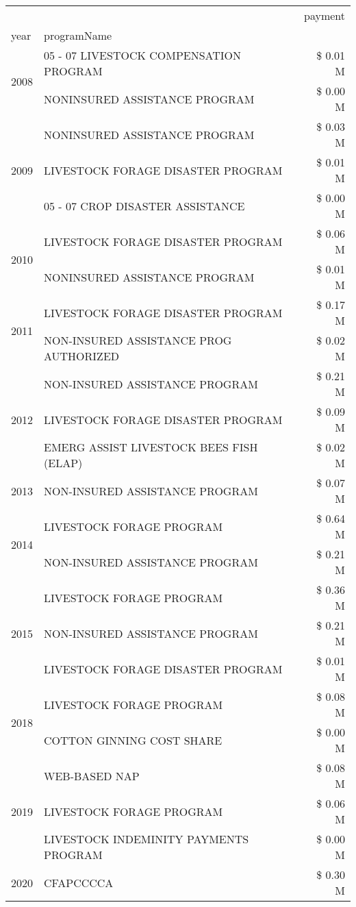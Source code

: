 \begin{tabular}{llr}
\toprule
 &  & payment \\
year & programName &  \\
\midrule
\multirow[t]{2}{*}{2008} & 05 - 07 LIVESTOCK COMPENSATION PROGRAM & \$ 0.01 M \\
 & NONINSURED ASSISTANCE PROGRAM & \$ 0.00 M \\
\cline{1-3}
\multirow[t]{3}{*}{2009} & NONINSURED ASSISTANCE PROGRAM & \$ 0.03 M \\
 & LIVESTOCK FORAGE DISASTER  PROGRAM & \$ 0.01 M \\
 & 05 - 07 CROP DISASTER ASSISTANCE & \$ 0.00 M \\
\cline{1-3}
\multirow[t]{2}{*}{2010} & LIVESTOCK FORAGE DISASTER PROGRAM & \$ 0.06 M \\
 & NONINSURED ASSISTANCE PROGRAM & \$ 0.01 M \\
\cline{1-3}
\multirow[t]{2}{*}{2011} & LIVESTOCK FORAGE DISASTER PROGRAM & \$ 0.17 M \\
 & NON-INSURED ASSISTANCE PROG AUTHORIZED & \$ 0.02 M \\
\cline{1-3}
\multirow[t]{3}{*}{2012} & NON-INSURED ASSISTANCE PROGRAM & \$ 0.21 M \\
 & LIVESTOCK FORAGE DISASTER PROGRAM & \$ 0.09 M \\
 & EMERG ASSIST LIVESTOCK BEES FISH (ELAP) & \$ 0.02 M \\
\cline{1-3}
2013 & NON-INSURED ASSISTANCE PROGRAM & \$ 0.07 M \\
\cline{1-3}
\multirow[t]{2}{*}{2014} & LIVESTOCK FORAGE PROGRAM & \$ 0.64 M \\
 & NON-INSURED ASSISTANCE PROGRAM & \$ 0.21 M \\
\cline{1-3}
\multirow[t]{3}{*}{2015} & LIVESTOCK FORAGE PROGRAM & \$ 0.36 M \\
 & NON-INSURED ASSISTANCE PROGRAM & \$ 0.21 M \\
 & LIVESTOCK FORAGE DISASTER PROGRAM & \$ 0.01 M \\
\cline{1-3}
\multirow[t]{2}{*}{2018} & LIVESTOCK FORAGE PROGRAM & \$ 0.08 M \\
 & COTTON GINNING COST SHARE & \$ 0.00 M \\
\cline{1-3}
\multirow[t]{3}{*}{2019} & WEB-BASED NAP & \$ 0.08 M \\
 & LIVESTOCK FORAGE PROGRAM & \$ 0.06 M \\
 & LIVESTOCK INDEMINITY PAYMENTS PROGRAM & \$ 0.00 M \\
\cline{1-3}
\multirow[t]{3}{*}{2020} & CFAPCCCCA & \$ 0.30 M \\

\end{tabular}

